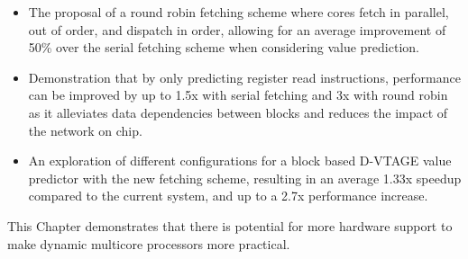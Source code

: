 \begin{itemize}
\item The proposal of a round robin fetching scheme where cores fetch in parallel, out of order, and dispatch in order, allowing for an average improvement of 50\% over the serial fetching scheme when considering value prediction.
\vspace{-0.5em}
\item Demonstration that by only predicting register read instructions, performance can be improved by up to 1.5x with serial fetching and 3x with round robin as it alleviates data dependencies between blocks and reduces the impact of the network on chip.
\vspace{-0.5em}
\item An exploration of different configurations for a block based D-VTAGE value predictor with the new fetching scheme, resulting in an average 1.33x speedup compared to the current system, and up to a 2.7x performance increase.
\end{itemize}

This Chapter demonstrates that there is potential for more hardware support to make dynamic multicore processors more practical.
